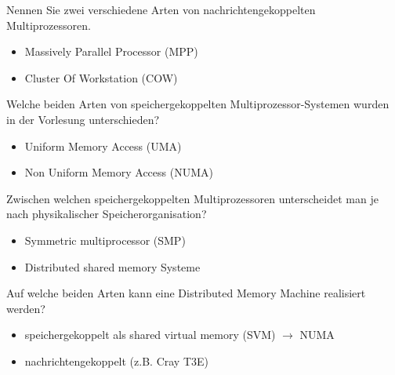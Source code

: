 {
    Nennen Sie zwei verschiedene Arten von nachrichtengekoppelten Multiprozessoren.
}
{
    \begin{itemize}
        \item Massively Parallel Processor (MPP)
        \item Cluster Of Workstation (COW)
    \end{itemize}
}

{
    Welche beiden Arten von speichergekoppelten Multiprozessor-Systemen wurden in der Vorlesung unterschieden?
}
{
    \begin{itemize}
        \item Uniform Memory Access (UMA)
        \item Non Uniform Memory Access (NUMA)
    \end{itemize}
}

{
    Zwischen welchen speichergekoppelten Multiprozessoren unterscheidet man je nach physikalischer Speicherorganisation?
}
{
    \begin{itemize}
        \item Symmetric multiprocessor (SMP)
        \item Distributed shared memory Systeme
    \end{itemize}
}

{
    Auf welche beiden Arten kann eine Distributed Memory Machine realisiert werden?
}
{
    \begin{itemize}
        \item speichergekoppelt als shared virtual memory (SVM) $\to$ NUMA
        \item nachrichtengekoppelt (z.B. Cray T3E)
    \end{itemize}
}

